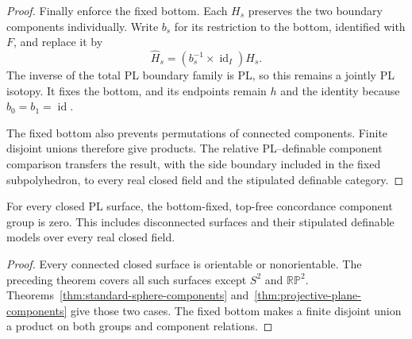 \begin{proof}
Finally enforce the fixed bottom.  Each $H_s$ preserves the two boundary
components individually.  Write $b_s$ for its restriction to the
bottom, identified with $F$, and replace it by
\[
                   \widehat H_s=(b_s^{-1}\times\operatorname{id}_I)H_s.
\]
The inverse of the total PL boundary family is PL, so this remains a
jointly PL isotopy.  It fixes the bottom, and its endpoints remain $h$
and the identity because $b_0=b_1=\operatorname{id}$.

The fixed bottom also prevents permutations of connected components.
Finite disjoint unions therefore give products.  The relative
PL--definable component comparison transfers the result, with the side
boundary included in the fixed subpolyhedron, to every real closed
field and the stipulated definable category.
\end{proof}


\begin{corollary}\label{cor:all-closed-surface-components}
For every closed PL surface, the bottom-fixed, top-free concordance
component group is zero. This includes disconnected surfaces and
their stipulated definable models over every real closed field.
\end{corollary}

\begin{proof}
Every connected closed surface is orientable or nonorientable.
The preceding theorem covers all such surfaces except $S^2$ and
$\mathbb{RP}^2$. Theorems~\ref{thm:standard-sphere-components}
and~\ref{thm:projective-plane-components} give those two cases.
The fixed bottom makes a finite disjoint union a product on both
groups and component relations.
\end{proof}
